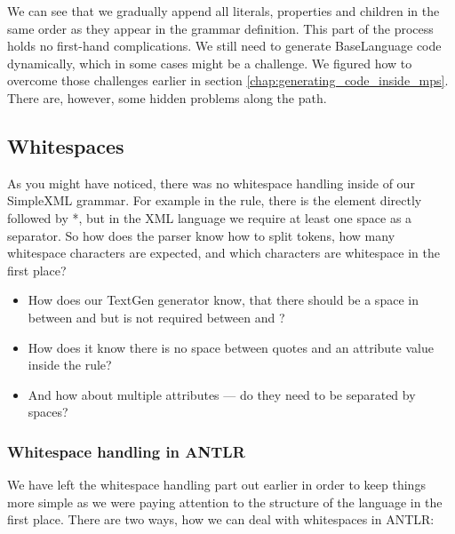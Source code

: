 We can see that we gradually append all literals, properties and children in the same order as they appear in the grammar definition.
This part of the process holds no first-hand complications.
We still need to generate BaseLanguage code dynamically, which in some cases might be a challenge.
We figured how to overcome those challenges earlier in section \ref{chap:generating_code_inside_mps}.
There are, however, some hidden problems along the path.

\subsection{Whitespaces}
\label{chap:whitespaces}

As you might have noticed, there was no whitespace handling inside of our SimpleXML grammar.
For example in the  rule, there is  the element directly followed by *, but in the XML language we require at least one space as a separator.
So how does the parser know how to split tokens, how many whitespace characters are expected, and which characters are whitespace in the first place?

\begin{itemize}
	\item How does our TextGen generator know, that there should be a space in between  and  but is not required between \literal{\textless} and ?
	
	\item How does it know there is no space between quotes and an attribute value inside the  rule?
	
	\item And how about multiple attributes --- do they need to be separated by spaces?
\end{itemize}

\subsubsection{Whitespace handling in ANTLR}

We have left the whitespace handling part out earlier in order to keep things more simple as we were paying attention to the structure of the language in the first place.
There are two ways, how we can deal with whitespaces in ANTLR:

